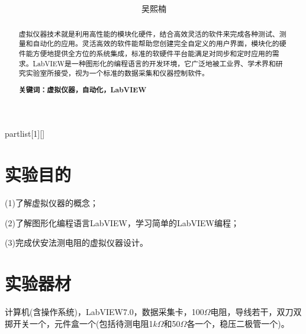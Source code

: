 \documentclass[UTF8]{ctexart}
\author{
	吴熙楠}
\title{
	\heiti{虚拟仪器在物理实验中的应用实验报告}
}
\begin{document}
	\maketitle
	\newtheorem{definition}{定义}[subsection]
	\newtheorem{function}{公式}[subsection]
	\newtheorem{summary}{小结}[subsection]
	\newtheorem{deduction}{推论}[subsection]
	\newtheorem{property}{性质}[subsection]
	\newtheorem{theo}{定理}[subsection]
	\newtheorem{step}{步骤}[subsection]
	\newtheorem{remark}{注记}[subsection]
	\newtheorem{proof}{证明}[subsection]
	\newenvironment{Theorem}[1][]{\par\noindent\textbf{定理}(#1)\quad}{\par}
	\newcommand{\rbra}[1]{\left( #1 \right)}
	\newcommand{\sbra}[1]{\left[ #1 \right]}
	\newcommand{\cbra}[1]{\left\{ #1 \right\}}
	\newcommand{\pbra}[1]{\left< #1 \right>}
	\newcommand{\abs}[1]{\left| #1 \right|}
	\newcommand{\fs}[2]{\displaystyle\frac{#1}{#2}}
	
	\newenvironment{myproof}{{\color{blue}证：}}
	
	\newenvironment{partlist}[1][]
	{\begin{enumerate}[itemsep=0pt, label=(\arabic*), wide, labelindent=\parindent, listparindent=\parindent, #1]}
		{\end{enumerate}}
	
	\renewcommand{\contentsname}{目录} %
	\tableofcontents
	\newpage
	\renewcommand{\abstractname}{\large 摘要\\}
	\begin{abstract}
		虚拟仪器技术就是利用高性能的模块化硬件，结合高效灵活的软件来完成各种测试、测量和自动化的应用。灵活高效的软件能帮助您创建完全自定义的用户界面，模块化的硬件能方便地提供全方位的系统集成，标准的软硬件平台能满足对同步和定时应用的需求。LabVIEW是一种图形化的编程语言的开发环境，它广泛地被工业界、学术界和研究实验室所接受，视为一个标准的数据采集和仪器控制软件。
		
		\textbf{关键词：虚拟仪器，自动化，LabVIEW}
	\end{abstract}
	\section{实验目的}
	(1)了解虚拟仪器的概念；
	\par (2)了解图形化编程语言LabVIEW，学习简单的LabVIEW编程；
	\par (3)完成伏安法测电阻的虚拟仪器设计。
	\section{实验器材}
	计算机(含操作系统)，LabVIEW7.0，数据采集卡，100$\Omega$电阻，导线若干，双刀双掷开关一个，元件盒一个(包括待测电阻1$k\Omega$和50$\Omega$各一个，稳压二极管一个)。
\end{document}
